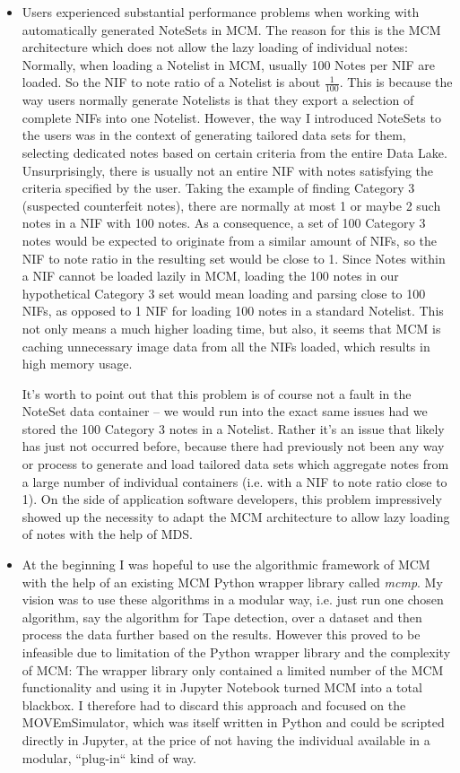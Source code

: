 \begin{itemize}
	\item Users experienced substantial performance problems when working with automatically generated NoteSets in MCM. The reason for this is the MCM architecture which does not allow the lazy loading of individual notes: Normally, when loading a Notelist in MCM, usually 100 Notes per NIF are loaded. So the NIF to note ratio of a Notelist is about $\frac{1}{100}$. This is because the way users normally generate Notelists is that they export a selection of complete NIFs into one Notelist. However, the way I introduced NoteSets to the users was in the context of generating tailored data sets for them, selecting dedicated notes based on certain criteria from the entire Data Lake. Unsurprisingly, there is usually not an entire NIF with notes satisfying the criteria specified by the user. Taking the example of finding Category 3 (suspected counterfeit notes), there are normally at most 1 or maybe 2 such notes in a NIF with 100 notes. As a consequence, a set of 100 Category 3 notes would be expected to originate from a similar amount of NIFs, so the NIF to note ratio in the resulting set would be close to 1. Since Notes within a NIF cannot be loaded lazily in MCM, loading the 100 notes in our hypothetical Category 3 set would mean loading and parsing close to 100 NIFs, as opposed to 1 NIF for loading 100 notes in a standard Notelist. This not only means a much higher loading time, but also, it seems that MCM is caching unnecessary image data from all the NIFs loaded, which results in high memory usage. \par
It's worth to point out that this problem is of course not a fault in the NoteSet data container -- we would run into the exact same issues had we stored the 100 Category 3 notes in a Notelist. Rather it's an issue that likely has just not occurred before, because there had previously not been any way or process to generate and load tailored data sets which aggregate notes from a large number of individual containers (i.e. with a NIF to note ratio close to 1). On the side of application software developers, this problem impressively showed up the necessity to adapt the MCM architecture to allow lazy loading of notes with the help of MDS. 
\item At the beginning I was hopeful to use the algorithmic framework of MCM with the help of an existing MCM Python wrapper library called \emph{mcmp}. My vision was to use these algorithms in a modular way, i.e. just run one chosen algorithm, say the algorithm for Tape detection, over a dataset and then process the data further based on the results. However this proved to be infeasible due to limitation of the Python wrapper library and the complexity of MCM: The wrapper library only contained a limited number of the MCM functionality and using it in Jupyter Notebook turned MCM into a total blackbox. I therefore had to discard this approach and focused on the MOVEmSimulator, which was itself written in Python and could be scripted directly in Jupyter, at the price of not having the individual available in a modular, ``plug-in`` kind of way. 
\end{itemize}

